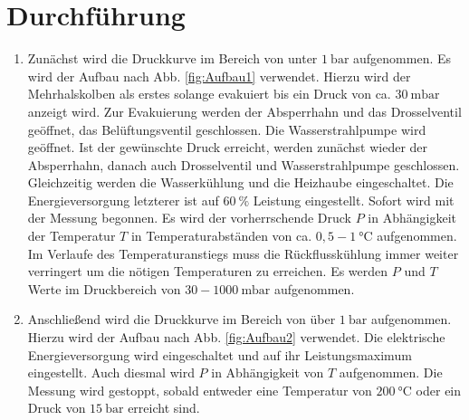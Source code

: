 
\section{Durchführung}
\label{sec:Durchführung}

\renewcommand{\labelenumi}{\alph{enumi})}
\begin{enumerate}
  \item Zunächst wird die Druckkurve im Bereich von unter $\SI{1}{\bar}$ aufgenommen.
   Es wird der Aufbau nach Abb. \ref{fig:Aufbau1} verwendet.
  Hierzu wird der Mehrhalskolben als erstes solange evakuiert bis ein
  Druck von ca. $\SI{30}{\milli\bar}$ anzeigt wird. Zur Evakuierung werden der
   Absperrhahn und das Drosselventil geöffnet, das Belüftungsventil geschlossen.
    Die Wasserstrahlpumpe wird geöffnet.
    Ist der gewünschte Druck erreicht, werden zunächst wieder der Absperrhahn,
     danach auch Drosselventil und Wasserstrahlpumpe geschlossen. Gleichzeitig
     werden die Wasserkühlung und die Heizhaube eingeschaltet. Die Energieversorgung
     letzterer ist auf $\SI{60}{\percent}$ Leistung eingestellt. Sofort wird mit
      der Messung begonnen. Es wird der vorherrschende Druck $P$ in Abhängigkeit der Temperatur
       $T$ in Temperaturabständen von ca. $0,5- \SI{1}{\degreeCelsius}$ aufgenommen.
       Im Verlaufe des Temperaturanstiegs muss die Rückflusskühlung immer weiter
        verringert um die nötigen Temperaturen zu erreichen. Es werden $P$ und $T$
         Werte im Druckbereich von $30- \SI{1000}{\milli\bar}$ aufgenommen.

         \item Anschließend wird die Druckkurve im Bereich von über $\SI{1}{\bar}$
          aufgenommen. Hierzu wird der Aufbau nach Abb. \ref{fig:Aufbau2} verwendet. Die
           elektrische Energieversorgung wird eingeschaltet und auf ihr Leistungsmaximum
            eingestellt. Auch diesmal wird $P$ in Abhängigkeit von $T$ aufgenommen.
             Die Messung wird gestoppt, sobald entweder eine Temperatur von $\SI{200}{\degreeCelsius}$
              oder ein Druck von $\SI{15}{\bar}$ erreicht sind.
\end{enumerate}
